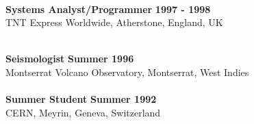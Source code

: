 \documentclass[margin,line]{res}
\begin{document}
\begin{resume}
\begin{comment}
Developed the first web-based seismic monitoring system for volcanoes. Featured near-real-time
spectrograms, reduced displacement and helicorder plots, and a web-configurable tremor alarm
system. This has remained a core AVO monitoring tool since 1998 and inspired spin-offs at other
observatories. Participated in volcano and
earthquake monitoring, including the Shishaldin eruption in 1999. Investigated different types
of tremor at Shishaldin volcano.
\end{comment}
\\
%
{\bf Systems Analyst/Programmer} \hfill {\bf 1997 - 1998}\\
TNT Express Worldwide, Atherstone, England, UK\\
\begin{comment}
Three month intensive training course in systems analysis, software design and programming
Assigned to the re-engineering team thereafter.
\end{comment}
\\
%
{\bf Seismologist} \hfill {\bf Summer 1996}\\
Montserrat Volcano Observatory, Montserrat, West Indies \\
\\
%
{\bf Summer Student} \hfill {\bf Summer 1992}\\
CERN, Meyrin, Geneva, Switzerland
\begin{comment}
Three month intensive training course in particle physics.
Computer simulation of muon detectors.
\end{comment}
\\
%
\begin{comment}
{\bf Electronics Technician} \hfill {\bf Summer 1989 & 1990}\\
Druck Ltd., Groby, Leics, UK
Testing and calibration of pressure transducers.
\end{comment}



\end{resume}
\end{document}
